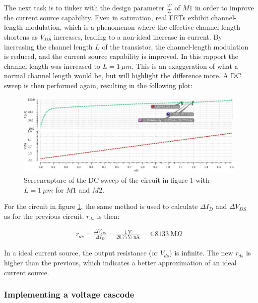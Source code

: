 \documentclass[onecolumn]{article}
\begin{document}
The next task is to tinker with the design parameter $\frac{W}{L}$ of $M1$ in order to improve the current source capability. Even in saturation, real FETs exhibit channel-length modulation, which is a phenomenon where the effective channel length shortens as $V_{DS}$ increases, leading to a non-ideal increase in current. By increasing the channel length $L$ of the transistor, the channel-length modulation is reduced, and the current source capability is improved.
In this rapport the channel length was increased to $L = 1 \ \mu m$. This is an exaggeration of what a normal channel length would be, but will highlight the difference more. A DC sweep is then performed again, resulting in the following plot: 

\begin{figure}[h!]
    \centering
    \includegraphics[width=1\textwidth]{plot_circuit_d_FINAL.png}
    \caption{Screencapture of the DC sweep of the circuit in figure 1 with $L = 1 \ \mu m$ for $M1$ and $M2$.}
    \label{fig:plotcnew}
\end{figure}

For the circuit in figure \ref{fig:plotcnew}, the same method is used to calculate $\Delta I_D$ and $\Delta V_{DS}$ as for the previous circuit. $r_{ds}$ is then:

\begin{align}
    r_{ds} = \frac{\Delta V_{DS}}{\Delta  I_D} = \frac{ 1 \ \text{V}}{20.7757 \ \text{nA}} = 4.8133 \ \text{M}\Omega
\end{align}


In a ideal current source, the output resistance (or $V_{ds}$) is infinite. The new $r_{ds}$ is higher than the previous, which indicates a better approximation of an ideal current source.

\clearpage

\subsubsection*{Implementing a voltage cascode}
\end{document}

